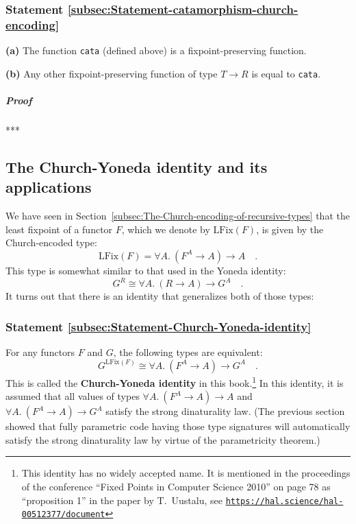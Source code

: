 \subsubsection{Statement \label{subsec:Statement-catamorphism-church-encoding}\ref{subsec:Statement-catamorphism-church-encoding}}

\textbf{(a)} The function \lstinline!cata! (defined above) is a fixpoint-preserving
function.

\textbf{(b)} Any other fixpoint-preserving function of type $T\rightarrow R$
is equal to \lstinline!cata!.

\subparagraph{Proof}

{*}{*}{*}

\subsection{The Church-Yoneda identity and its applications}

We have seen in Section~\ref{subsec:The-Church-encoding-of-recursive-types}
that the least fixpoint of a functor $F$, which we denote by $\text{LFix}(F)$,
is given by the Church-encoded type:
\[
\text{LFix}(F)=\forall A.\ (F^{A}\rightarrow A)\rightarrow A\quad.
\]
This type is somewhat similar to that used in the Yoneda identity:
\[
G^{R}\cong\forall A.\ (R\rightarrow A)\rightarrow G^{A}\quad.
\]
It turns out that there is an identity that generalizes both of those
types:

\subsubsection{Statement \label{subsec:Statement-Church-Yoneda-identity}\ref{subsec:Statement-Church-Yoneda-identity}}

For any functors $F$ and $G$, the following types are equivalent:
\[
G^{\text{LFix}(F)}\cong\forall A.\ (F^{A}\rightarrow A)\rightarrow G^{A}\quad.
\]
This is called the \textbf{Church-Yoneda
identity} in this book.\footnote{This identity has no widely accepted name. It is mentioned in the
proceedings of the conference \textsf{``}Fixed Points in Computer Science
2010\textsf{''} on page 78 as \textsf{``}proposition 1\textsf{''} in the paper by T.~Uustalu,
see \texttt{\href{https://hal.science/hal-00512377/document}{https://hal.science/hal-00512377/document}}} In this identity, it is assumed that all values of types $\forall A.\ (F^{A}\rightarrow A)\rightarrow A$
and $\forall A.\ (F^{A}\rightarrow A)\rightarrow G^{A}$ satisfy the
strong dinaturality law. (The previous section showed that fully parametric
code having those type signatures will automatically satisfy the strong
dinaturality law by virtue of the parametricity theorem.)

